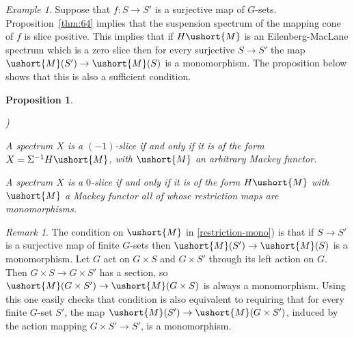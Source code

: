 \documentclass{amsart}
\newtheorem{prop}[equation]{Proposition}
\newtheorem{rem}[equation]{Remark}
\theoremstyle{definition}
\theoremstyle{remark}
\newtheorem{rem}[equation]{Remark}
\newtheorem{eg}[equation]{Example}
\newcounter{thmItem}
\newcommand{\thmItemref}[1]
 	 {{\rm \ref{#1})}}
\newenvironment{thmList}{\begin{list}%
{\rm \roman{thmItem})}{\usecounter{thmItem}
\setlength{\labelwidth}{2em}
\setlength{\itemindent}{2em}
\setlength{\leftmargin}{0pt}
\setlength{\listparindent}{0pt}
\setlength{\parsep}{0pt}
\setlength{\partopsep}{0pt}
\setlength{\itemsep}{\medskipamount}
\setlength{\topsep}{\medskipamount}
}}{\end{list}}
\newcommand{\Mm}{\ushort{M}}
\begin{document}
\begin{eg}
\label{eg:7} Suppose that $f:S\to S'$ is a surjective map of $G$-sets.
Proposition~\ref{thm:64} implies that the suspension spectrum of the
mapping cone of $f$ is slice positive.  This implies that if $H\Mm$ is
an Eilenberg-MacLane spectrum which is a zero slice then for every
surjective $S\to S'$ the map $\Mm(S')\to \Mm(S)$ is a monomorphism.  The
proposition below shows that this is also a sufficient condition.
\end{eg}




\begin{prop}
\label{thm:185} 
\begin{thmList}
\item A spectrum $X$ is a $(-1)$-slice if and only if it is of the
form $X=\Sigma^{-1}H\Mm$, with $\Mm$ an arbitrary Mackey functor.
\item\label{restriction-mono} A spectrum $X$ is a $0$-slice if and
only if it is of the form $H\Mm$ with $\Mm$ a Mackey functor all of whose
restriction maps are monomorphisms.
\end{thmList}
\end{prop}

\begin{rem}
\label{rem:44} The condition on $\Mm$ in \thmItemref{restriction-mono}
is that if $S\to S'$ is a surjective map of finite $G$-sets then
$\Mm(S')\to \Mm(S)$ is a monomorphism.  Let $G$ act on $G\times S$ and
$G\times S'$ through its left action on $G$.  Then $G\times S\to
G\times S'$ has a section, so $\Mm(G\times S')\to \Mm(G\times S)$ is
always a monomorphism.  Using this one easily checks that condition is
also equivalent to requiring that for every finite $G$-set $S'$, the
map $\Mm(S')\to \Mm(G\times S')$, induced by the action mapping $G\times
S'\to S'$, is a monomorphism.
\end{rem}
\end{document}
